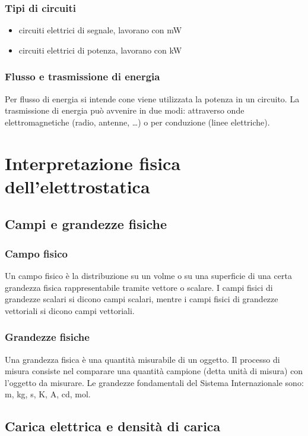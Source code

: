 \documentclass[a4paper]{article}
\begin{document}
\subsubsection*{Tipi di circuiti}
\begin{itemize}
	\item circuiti elettrici di segnale, lavorano con mW
	\item circuiti elettrici di potenza, lavorano con kW
\end{itemize}

\subsubsection*{Flusso e trasmissione di energia}
Per flusso di energia si intende cone viene utilizzata la potenza in un circuito. La trasmissione di energia può avvenire in due
modi: attraverso onde elettromagnetiche (radio, antenne, \dots) o per conduzione (linee elettriche).

\newpage

\section{Interpretazione fisica dell'elettrostatica}
\subsection{Campi e grandezze fisiche}
\subsubsection*{Campo fisico}
Un campo fisico è la distribuzione su un volme o su una superficie di una certa grandezza fisica rappresentabile tramite vettore
o scalare. I campi fisici di grandezze scalari si dicono campi scalari, mentre i campi fisici di grandezze vettoriali si dicono
campi vettoriali.

\subsubsection*{Grandezze fisiche}
Una grandezza fisica è una quantità misurabile di un oggetto. Il processo di misura consiste nel comparare una quantità campione
(detta unità di misura) con l'oggetto da misurare. Le grandezze fondamentali del Sistema Internazionale sono: m, kg, s, K, A, cd,
mol.

\subsection{Carica elettrica e densità di carica}
\end{document}
